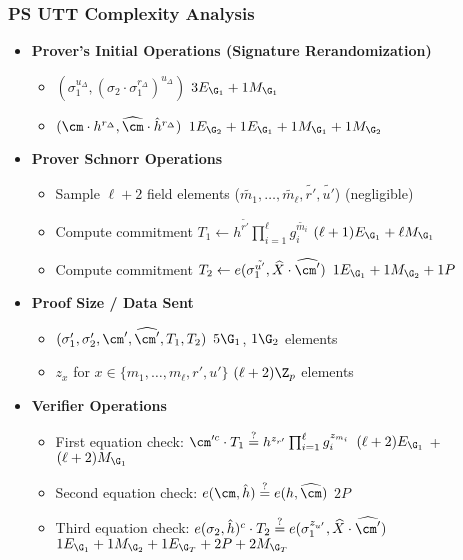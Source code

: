 \newpage
\subsubsection{PS UTT Complexity Analysis \cite{tomescu2022utt}}
\begin{itemize}
    \item \textbf{Prover's Initial Operations (Signature Rerandomization)}
    \begin{itemize}
        \item $(\sigma_1^{u_\Delta}, (\sigma_2\cdot \sigma_1^{r_\Delta})^{u_\Delta})$ \qquad $3E_{\G_1} + 1M_{\G_1}$
        \item $(\cm \cdot h^{r_\Delta}, \widehat{\cm} \cdot \hat{h}^{r_\Delta})$ \qquad $1E_{\G_2} + 1E_{\G_1} + 1M_{\G_1} + 1M_{\G_2}$
    \end{itemize}
\item \textbf{Prover Schnorr Operations}
    \begin{itemize}
        \item Sample $\ell+2$ field elements ($\tilde{m_1},\ldots,\tilde{m_\ell}, \tilde{r'}, \tilde{u'}$) \qquad (negligible)
        \item Compute commitment $T_1 \gets h^{\tilde{r'}} \prod_{i=1}^\ell g_i^{\tilde{m_i}}$ \qquad $(\ell + 1)E_{\G_1} + \ell M_{\G_1}$
        \item Compute commitment $T_2 \gets e(\sigma_1^{\tilde{u'}}, \widehat{X} \cdot \widehat{\cm'})$ \qquad $1E_{\G_1} + 1M_{\G_2} + 1P$
    \end{itemize}
    
\item \textbf{Proof Size / Data Sent}
    \begin{itemize}
        \item $(\sigma_1', \sigma_2', \cm', \widehat{\cm'}, T_1, T_2)$ \qquad $5\G_1$, $1\G_2$ elements
        \item $z_x$ for $x \in \{m_1,\ldots,m_\ell, r', u'\}$ \qquad $(\ell+2)\Z_p$ elements
    \end{itemize}
    
\item \textbf{Verifier Operations}
    \begin{itemize}
        \item First equation check: $\cm'^c \cdot T_1 \stackrel{?}{=} h^{z_{r'}} \prod_{i=1}^\ell g_i^{z_{m_i}}$ \qquad $(\ell + 2) E_{\G_1}$ + $(\ell + 2) M_{\G_1}$
        \item Second equation check: $e(\cm, \hat{h}) \stackrel{?}{=} e(h, \widehat{\cm})$ \qquad $2P$
        \item Third equation check: $e(\sigma_2, \hat{h})^c \cdot T_2 \stackrel{?}{=} e(\sigma_1^{z_{u'}}, \widehat{X} \cdot \widehat{\cm'})$ \qquad $ 1E_{\G_1} + 1M_{\G_2} + 1E_{\G_T} + 2P + 2M_{\G_T} $
    \end{itemize}
\end{itemize}

